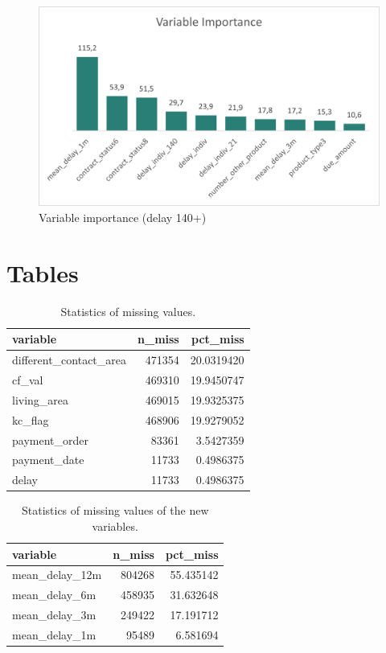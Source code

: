 \documentclass[
]{article}
\begin{document}
\begin{figure}
\includegraphics[width=0.9\linewidth]{varimp140} \caption{\label{fig:varIm21}Variable importance (delay 140+)}\label{fig:varIm140}
\end{figure}

\hypertarget{tables}{%
\section{Tables}\label{tables}}

\begin{table}

\caption{\label{tab:Missing-stat}Statistics of missing values.}
\centering
\begin{tabular}[t]{l|r|r}
\hline
variable & n\_miss & pct\_miss\\
\hline
different\_contact\_area & 471354 & 20.0319420\\
\hline
cf\_val & 469310 & 19.9450747\\
\hline
living\_area & 469015 & 19.9325375\\
\hline
kc\_flag & 468906 & 19.9279052\\
\hline
payment\_order & 83361 & 3.5427359\\
\hline
payment\_date & 11733 & 0.4986375\\
\hline
delay & 11733 & 0.4986375\\
\hline
\end{tabular}
\end{table}

\begin{table}

\caption{\label{tab:miss-statnew}Statistics of missing values of the new variables.}
\centering
\begin{tabular}[t]{l|r|r}
\hline
variable & n\_miss & pct\_miss\\
\hline
mean\_delay\_12m & 804268 & 55.435142\\
\hline
mean\_delay\_6m & 458935 & 31.632648\\
\hline
mean\_delay\_3m & 249422 & 17.191712\\
\hline
mean\_delay\_1m & 95489 & 6.581694\\
\hline
\end{tabular}
\end{table}
\end{document}
